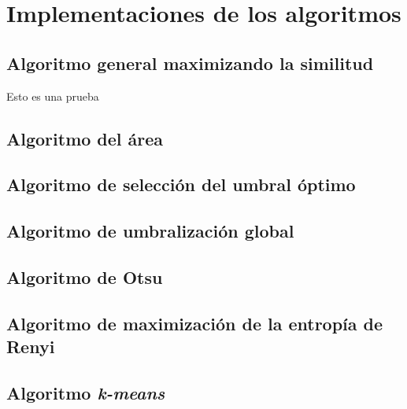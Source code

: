 \chapter{Implementaciones de los algoritmos}

\section{Algoritmo general maximizando la similitud}

{}
\begin{listing}\label{cod:alg1}
    \caption{Esto es una prueba}
\end{listing}

\section{Algoritmo del área}
\section{Algoritmo de selección del umbral óptimo}
\section{Algoritmo de umbralización global}
\section{Algoritmo de Otsu}
\section{Algoritmo de maximización de la entropía de Renyi}
\section{Algoritmo {\em k-means}}
